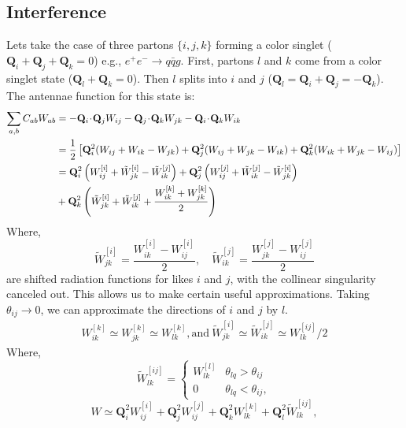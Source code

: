 \subsection{Interference}
Lets take the case of three partons \(\{i,j,k\}\) forming a color singlet (\(\mathbf{Q}_i + \mathbf{Q}_j +\mathbf{Q}_k = 0\)) e.g., \(e^+e^-\to q\bar{q} g\). First, partons \(l\) and \(k\) come from a color singlet state (\(\mathbf{Q}_l +\mathbf{Q}_k = 0\)). Then \(l\) splits into \(i\) and \(j\) (\(\mathbf{Q}_l = \mathbf{Q}_i + \mathbf{Q}_j = -\mathbf{Q}_k\)). The antennae function for this state is:
\begin{align}
		\label{eq:threePartonW}
  \sum_{a,b}C_{ab}W_{ab} &= -\mathbf{Q}_i\!\cdot\!\mathbf{Q}_jW_{ij} -\mathbf{Q}_j\!\cdot\!\mathbf{Q}_kW_{jk} -\mathbf{Q}_i\!\cdot\!\mathbf{Q}_kW_{ik} \notag\\
	&= \frac{1}{2}\left[\mathbf{Q}_i^2(W_{ij} + W_{ik} - W_{jk}) + \mathbf{Q}_j^2(W_{ij} + W_{jk} - W_{ik}) + \mathbf{Q}_k^2(W_{ik} + W_{jk} - W_{ij})\right]\notag\\
	&=\mathbf{Q}_i^2\left(W_{ij}^{[i]} + \tilde{W}_{jk}^{[i]} - \tilde{W}_{ik}^{[j]}\right) + \mathbf{Q}_j^2\left(W_{ij}^{[j]} + \tilde{W}_{ik}^{[j]} - \tilde{W}_{jk}^{[i]}\right) \notag\\
	& + \mathbf{Q}_k^2\left(\tilde{W}_{jk}^{[i]} + \tilde{W}_{ik}^{[j]} + \frac{W_{ik}^{[k]} + W_{jk}^{[k]} }{2}\right)
\end{align}
Where,
\begin{equation}
	\tilde{W}_{jk}^{[i]} = \frac{W^{[i]}_{ik} - W^{[i]}_{ij}}{2},\quad \tilde{W}_{ik}^{[j]} = \frac{W^{[j]}_{jk} - W^{[j]}_{ij}}{2}
\end{equation}
are shifted radiation functions for likes \(i\) and \(j\), with the collinear singularity canceled out. This allows us to make certain useful approximations. Taking \(\theta_{ij}\to0\), we can approximate the directions of \(i\) and \(j\) by \(l\). 
\begin{align}
	W_{ik}^{[k]} \simeq W_{jk}^{[k]} \simeq W_{lk}^{[k]},\text{and}~\tilde{W}_{jk}^{[i]} \simeq \tilde{W}_{ik}^{[j]} \simeq W_{lk}^{[ij]}/2 
\end{align}
Where, 
\begin{equation}
	\tilde{W}^{[ij]}_{lk} = \begin{cases}
		W^{[l]}_{lk} & \theta_{lq}>\theta_{ij}\\[-10pt]
		0            & \theta_{lq}<\theta_{ij},
	\end{cases}
\end{equation}
\begin{equation}
	W \simeq \mathbf{Q}_i^2W^{[i]}_{ij} + \mathbf{Q}_j^2W^{[j]}_{ij}
	+ \mathbf{Q}_k^2W^{[k]}_{lk} + \mathbf{Q}_l^2\tilde{W}^{[ij]}_{lk},
	\label{eq:coherentPattern}
\end{equation}

